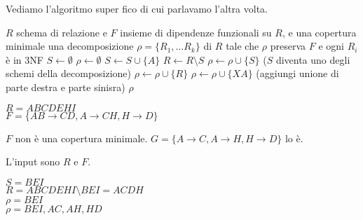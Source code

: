 Vediamo l'algoritmo super fico di cui parlavamo l'altra volta.
\begin{algorithm}[ht]
\caption{Algoritmo per la creazione di una decomposizione $\rho$ di $R$ che preserva $F$ e \`e in 3NF}
\label{algoritmo_definitivo}
\begin{algorithmic}
\Require $R$ schema di relazione e $F$ insieme di dipendenze funzionali su $R$, e una copertura minimale
\Ensure una decomposizione $\rho = \{ R_1, \dots R_k\}$ di $R$ tale che $\rho$ preserva $F$ e ogni $R_i$ \`e in 3NF
\State $S \gets \emptyset$
\State $\rho \gets \emptyset$
    \State $S \gets S \cup \{ A \}$
\EndFor
{}
    \State $R \gets R \setminus S$
    \State $\rho \gets \rho \cup \{ S \}$ ($S$ diventa uno degli schemi della decomposizione)
\EndIf
{}
    \State $\rho \gets \rho \cup \{ R \}$
\Else
        \State $\rho \gets \rho \cup \{ XA \}$ (aggiungi unione di parte destra e parte sinisra)
    \EndFor
\EndIf
\State \Return $\rho$
\end{algorithmic}
\end{algorithm}


\begin{exmp}
$R = ABCDEHI$ \\
$F = \{ AB \to CD, A \to CH, H \to D \}$

$F$ non \`e una copertura minimale. $G = \{ A \to C, A \to H, H \to D \}$ lo \`e.

L'input sono $R$ e $F$.

$S = BEI$ \\
$R = ABCDEHI \setminus BEI = ACDH$ \\
$\rho = BEI$ \\
$\rho = BEI, AC, AH, HD$
\end{exmp}

